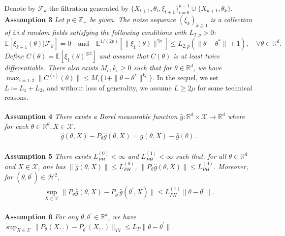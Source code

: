 \documentclass[a4paper]{article}
\newcommand{\norm}[1]{\|#1 \|}
\newcommand{\Exs}{\mathbb{E}}
\newcommand{\thetastar}{\theta^*}
\newcommand{\constLPH}[1]{L_{PH}^{(#1)}}
\begin{document}
	Denote by $\mathcal{F}_{k}$ the filtration generated by $\{X_{t + 1}, \theta_{t}, \xi_{t + 1}\}_{t = 0}^{k - 1} \cup \{X_{k + 1}, \theta_{k}\}$.
	\\
	\textbf{Assumption 3} \textit{
		Let $p \in \mathbb{Z}_{+}$ be given. The noise sequence $\left(\xi_{k}\right)_{k \ge 1}$ is a collection of i.i.d random fields satisfying the following conditions with $L_{2, p} > 0$:
		$$\Exs\left[\xi_{k + 1}(\theta) | \mathcal{F}_{k}\right] = 0 \quad \text{and} \quad \Exs^{1 / (2p)}\left[\norm{\xi_{1}(\theta)}^{2p}\right] \le L_{2, p}\left(\norm{\theta - \thetastar} + 1\right), \quad \forall \theta \in \mathbb{R}^{d}.$$
		Define $C(\theta) = \Exs\left[\xi_{1}(\theta)^{\otimes 2}\right]$ and assume that $C(\theta)$ is at least twice differentiable. There also exists $M_{\epsilon}, k_{\epsilon} \ge 0$ such that for $\theta \in \mathbb{R}^{d}$, we have $\max_{i = 1, 2}\norm{C^{(i)}(\theta)} \le M_{\epsilon}\{1 + \norm{\theta - \thetastar}^{k_{\epsilon}}\}$.
	}
	In the sequel, we set $L \coloneq L_{1} + L_{2}$, and without loss of generality, we assume $L \ge 2\mu$ for some technical reasons.
	\\
	\\
	\textbf{Assumption 4} \textit{
		There exists a Borel measurable function $\hat{g}: \mathbb{R}^{d} \times \mathcal{X} \to \mathbb{R}^{d}$ where for each $\theta \in \mathbb{R}^{d}, X \in \mathcal{X}$,
		\begin{align*}
			\hat{g}\left(\theta, X\right) - P_{\theta}\hat{g}\left(\theta, X\right) = g\left(\theta, X\right) - \bar{g}\left(\theta\right).
		\end{align*}
	}
	\\
	\textbf{Assumption 5} \textit{
		There exists $\constLPH{0} <‌ \infty$ and $\constLPH{1} < \infty$ such that, for all $\theta \in \mathbb{R}^{d}$ and $X \in \mathcal{X}$, one has $\norm{\hat{g}\left(\theta, X\right)} \le \constLPH{0}$, $\norm{P_{\theta}\hat{g}\left(\theta, X\right)} \le \constLPH{0}$. Moreover, for $\left(\theta, \theta^{\prime}\right) \in \mathcal{H}^{2}$,
		\begin{align*}
			\sup_{X \in \mathcal{X}}\norm{P_{\theta}\hat{g}\left(\theta, X\right) - P_{\theta^{\prime}}\hat{g}\left(\theta^{\prime}, X\right)} \le \constLPH{1}\norm{\theta - \theta^{\prime}}.
		\end{align*}
	}
	\\
	\textbf{Assumption 6} \textit{
		For any $\theta, \theta^{\prime} \in \mathbb{R}^{d}$, we have $\sup_{X \in \mathcal{X}}\norm{P_{\theta}\left(X, .\right) - P_{\theta^{\prime}}\left(X, .\right)}_{TV} \le L_{P}\norm{\theta - \theta^{\prime}}$.
	}
\end{document}

